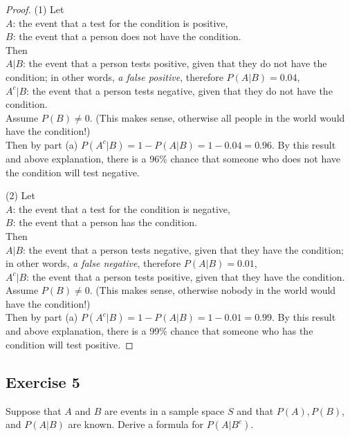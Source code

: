 \documentclass[14pt]{extarticle}
\begin{document}
\begin{proof}
     (1) Let \\
     \(A\): the event that a test for the condition is positive, \\ \(B\): the event that a person does not have the condition. \\
     Then \\
     \(A|B\): the event that a person tests positive, given that they do not have the condition; in other words, {\it a false
               positive}, therefore \(P(A|B) = 0.04\), \\
     \(A^c|B\): the event that a person tests negative, given that they do not have the condition. \\
     Assume \(P(B) \neq 0\). (This makes sense, otherwise all people in the world would have the condition!) \\
     Then by part (a) \(P(A^c | B) = 1 - P(A|B) = 1-0.04 = 0.96\). By this result and above explanation, there is a 96\% chance
     that someone who does not have the condition will test negative.

     (2) Let \\
     \(A\): the event that a test for the condition is negative, \\ \(B\): the event that a person has the condition. \\
     Then \\
     \(A|B\): the event that a person tests negative, given that they have the condition; in other words, {\it a false
               negative}, therefore \(P(A|B) = 0.01\), \\
     \(A^c|B\): the event that a person tests positive, given that they have the condition. \\
     Assume \(P(B) \neq 0\). (This makes sense, otherwise nobody in the world would have the condition!) \\
     Then by part (a) \(P(A^c | B) = 1 - P(A|B) = 1-0.01 = 0.99\). By this result and above explanation, there is a 99\% chance
     that someone who has the condition will test positive.
\end{proof}

\subsection{Exercise 5}
Suppose that \(A\) and \(B\) are events in a sample space \(S\) and that \(P(A), P(B)\), and \(P(A | B)\) are known.
Derive a formula for \(P(A | B^c)\).
\end{document}
